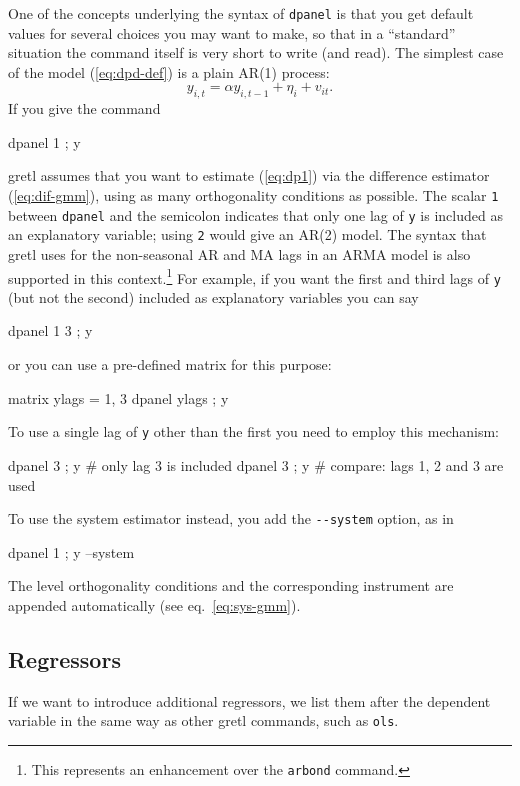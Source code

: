 One of the concepts underlying the syntax of \texttt{dpanel} is that
you get default values for several choices you may want to make, so
that in a ``standard'' situation the command itself is very short to
write (and read).  The simplest case of the model (\ref{eq:dpd-def})
is a plain AR(1) process:
\begin{equation}
\label{eq:dp1}
  y_{i,t} = \alpha y_{i,t-1} + \eta_{i} + v_{it} .
\end{equation}
If you give the command
\begin{code}
  dpanel 1 ; y
\end{code}
gretl assumes that you want to estimate (\ref{eq:dp1}) via the
difference estimator (\ref{eq:dif-gmm}), using as many orthogonality
conditions as possible.  The scalar \texttt{1} between \texttt{dpanel}
and the semicolon indicates that only one lag of \texttt{y} is
included as an explanatory variable; using \texttt{2} would give an
AR(2) model. The syntax that gretl uses for the non-seasonal AR and MA
lags in an ARMA model is also supported in this context.\footnote{This
  represents an enhancement over the \texttt{arbond} command.} For
example, if you want the first and third lags of \texttt{y} (but not
the second) included as explanatory variables you can say
\begin{code}
  dpanel {1 3} ; y
\end{code}
or you can use a pre-defined matrix for this purpose:
\begin{code}
  matrix ylags = {1, 3}
  dpanel ylags ; y
\end{code}
To use a single lag of \texttt{y} other than the first you need to
employ this mechanism:
\begin{code}
  dpanel {3} ; y # only lag 3 is included
  dpanel 3 ; y   # compare: lags 1, 2 and 3 are used
\end{code}

To use the system estimator instead, you add the \verb|--system|
option, as in
\begin{code}
  dpanel 1 ; y --system
\end{code}
The level orthogonality conditions and the corresponding instrument
are appended automatically (see eq.\ \ref{eq:sys-gmm}).

\subsection{Regressors}

If we want to introduce additional regressors, we list them after the
dependent variable in the same way as other gretl commands, such as
\texttt{ols}.

